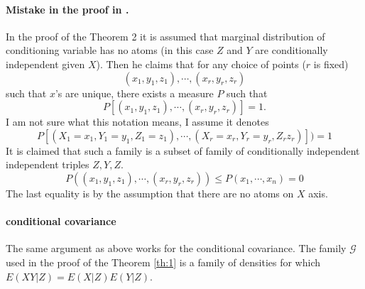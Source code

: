 \documentclass{article}
\begin{document}
\paragraph{Mistake in the proof in \cite{bergsma2004testing}.}
In the proof of the Theorem 2 it is assumed that marginal distribution of conditioning variable has no atoms (in this case $Z$ and $Y$ are  conditionally independent given $X$). Then he claims that for any choice of points ($r$ is fixed)
\[ (x_1 , y_1 , z_1 ), \cdots, (x_r , y_r , z_r ) \]  
such that $x$'s are unique, there exists a measure $P$ such that
\[
P[(x_1 , y_1 , z_1 ), \cdots , (x_r , y_r , z_r ) ] =1. 
\]
I am not sure what this notation  means, I assume it denotes 
\[
P[(X_1=x_1 ,Y_1= y_1 , Z_1=z_1 ), \cdots , (X_r = x_r , Y_r= y_r ,Z_r z_r ) ] ) =1
\]
It is claimed that such a family is a subset of family of conditionally independent independent triples $Z,Y,Z$.
\[
P( (x_1 , y_1 , z_1 ), \cdots , (x_r , y_r , z_r ) ) \leq  P(x_1,\cdots,x_n) =0
\]
The last equality is by the assumption that there are no atoms on $X$ axis.


\paragraph{conditional covariance}
The same argument as above works for the conditional covariance. The family $\mathcal G$ used in the proof of the Theorem \ref{th:1} is a family of densities for which $E(XY|Z)=E(X|Z)E(Y|Z)$. 




% 
\end{document}
